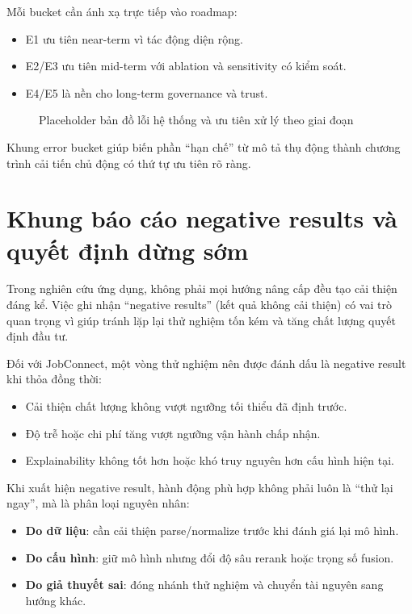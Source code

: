 Mỗi bucket cần ánh xạ trực tiếp vào roadmap:
\begin{itemize}
  \item E1 ưu tiên near-term vì tác động diện rộng.
  \item E2/E3 ưu tiên mid-term với ablation và sensitivity có kiểm soát.
  \item E4/E5 là nền cho long-term governance và trust.
\end{itemize}

\begin{figure}[H]
\centering
{}
\caption{Placeholder bản đồ lỗi hệ thống và ưu tiên xử lý theo giai đoạn}
\label{fig:error-bucket-roadmap-placeholder}
\end{figure}

Khung error bucket giúp biến phần ``hạn chế'' từ mô tả thụ động thành chương trình cải tiến chủ động có thứ tự ưu tiên rõ ràng.

\section{Khung báo cáo negative results và quyết định dừng sớm}

Trong nghiên cứu ứng dụng, không phải mọi hướng nâng cấp đều tạo cải thiện đáng kể. Việc ghi nhận ``negative results'' (kết quả không cải thiện) có vai trò quan trọng vì giúp tránh lặp lại thử nghiệm tốn kém và tăng chất lượng quyết định đầu tư.

Đối với JobConnect, một vòng thử nghiệm nên được đánh dấu là negative result khi thỏa đồng thời:
\begin{itemize}
  \item Cải thiện chất lượng không vượt ngưỡng tối thiểu đã định trước.
  \item Độ trễ hoặc chi phí tăng vượt ngưỡng vận hành chấp nhận.
  \item Explainability không tốt hơn hoặc khó truy nguyên hơn cấu hình hiện tại.
\end{itemize}

Khi xuất hiện negative result, hành động phù hợp không phải luôn là ``thử lại ngay'', mà là phân loại nguyên nhân:
\begin{itemize}
  \item \textbf{Do dữ liệu}: cần cải thiện parse/normalize trước khi đánh giá lại mô hình.
  \item \textbf{Do cấu hình}: giữ mô hình nhưng đổi độ sâu rerank hoặc trọng số fusion.
  \item \textbf{Do giả thuyết sai}: đóng nhánh thử nghiệm và chuyển tài nguyên sang hướng khác.
\end{itemize}

